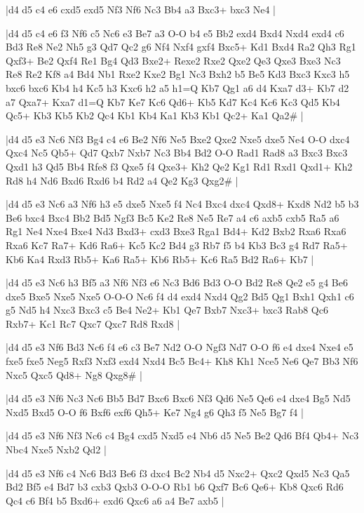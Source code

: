 \whitename{}
\blackname{}
\makegametitle
|d4 d5 c4 e6 cxd5 exd5 Nf3 Nf6 Nc3 Bb4 a3 Bxc3+ bxc3 Ne4  |

\whitename{}
\blackname{}
\makegametitle
|d4 d5 c4 e6 f3 Nf6 c5 Nc6 e3 Be7 a3 O-O b4 e5 Bb2 exd4 Bxd4 Nxd4 exd4 c6 Bd3 Re8 Ne2 Nh5 g3 Qd7 Qc2 g6 Nf4 Nxf4 gxf4 Bxc5+ Kd1 Bxd4 Ra2 Qh3 Rg1 Qxf3+ Be2 Qxf4 Re1 Bg4 Qd3 Bxe2+ Rexe2 Rxe2 Qxe2 Qe3 Qxe3 Bxe3 Nc3 Re8 Re2 Kf8 a4 Bd4 Nb1 Rxe2 Kxe2 Bg1 Nc3 Bxh2 b5 Be5 Kd3 Bxc3 Kxc3 h5 bxc6 bxc6 Kb4 h4 Kc5 h3 Kxc6 h2 a5 h1=Q Kb7 Qg1 a6 d4 Kxa7 d3+ Kb7 d2 a7 Qxa7+ Kxa7 d1=Q Kb7 Ke7 Kc6 Qd6+ Kb5 Kd7 Kc4 Kc6 Kc3 Qd5 Kb4 Qc5+ Kb3 Kb5 Kb2 Qc4 Kb1 Kb4 Ka1 Kb3 Kb1 Qc2+ Ka1 Qa2\#  |

\whitename{}
\blackname{}
\makegametitle
|d4 d5 e3 Nc6 Nf3 Bg4 c4 e6 Be2 Nf6 Ne5 Bxe2 Qxe2 Nxe5 dxe5 Ne4 O-O dxc4 Qxc4 Nc5 Qb5+ Qd7 Qxb7 Nxb7 Nc3 Bb4 Bd2 O-O Rad1 Rad8 a3 Bxc3 Bxc3 Qxd1 h3 Qd5 Bb4 Rfe8 f3 Qxe5 f4 Qxe3+ Kh2 Qe2 Kg1 Rd1 Rxd1 Qxd1+ Kh2 Rd8 h4 Nd6 Bxd6 Rxd6 b4 Rd2 a4 Qe2 Kg3 Qxg2\#  |

\whitename{}
\blackname{}
\makegametitle
|d4 d5 e3 Nc6 a3 Nf6 h3 e5 dxe5 Nxe5 f4 Nc4 Bxc4 dxc4 Qxd8+ Kxd8 Nd2 b5 b3 Be6 bxc4 Bxc4 Bb2 Bd5 Ngf3 Bc5 Ke2 Re8 Ne5 Re7 a4 c6 axb5 cxb5 Ra5 a6 Rg1 Ne4 Nxe4 Bxe4 Nd3 Bxd3+ cxd3 Bxe3 Rga1 Bd4+ Kd2 Bxb2 Rxa6 Rxa6 Rxa6 Kc7 Ra7+ Kd6 Ra6+ Kc5 Kc2 Bd4 g3 Rb7 f5 b4 Kb3 Bc3 g4 Rd7 Ra5+ Kb6 Ka4 Rxd3 Rb5+ Ka6 Ra5+ Kb6 Rb5+ Kc6 Ra5 Bd2 Ra6+ Kb7  |

\whitename{}
\blackname{}
\makegametitle
|d4 d5 e3 Nc6 h3 Bf5 a3 Nf6 Nf3 e6 Nc3 Bd6 Bd3 O-O Bd2 Re8 Qe2 e5 g4 Be6 dxe5 Bxe5 Nxe5 Nxe5 O-O-O Nc6 f4 d4 exd4 Nxd4 Qg2 Bd5 Qg1 Bxh1 Qxh1 c6 g5 Nd5 h4 Nxc3 Bxc3 c5 Be4 Ne2+ Kb1 Qe7 Bxb7 Nxc3+ bxc3 Rab8 Qc6 Rxb7+ Kc1 Rc7 Qxc7 Qxc7 Rd8 Rxd8  |

\whitename{}
\blackname{}
\makegametitle
|d4 d5 e3 Nf6 Bd3 Nc6 f4 e6 c3 Be7 Nd2 O-O Ngf3 Nd7 O-O f6 e4 dxe4 Nxe4 e5 fxe5 fxe5 Neg5 Rxf3 Nxf3 exd4 Nxd4 Bc5 Bc4+ Kh8 Kh1 Nce5 Ne6 Qe7 Bb3 Nf6 Nxc5 Qxc5 Qd8+ Ng8 Qxg8\#  |

\whitename{}
\blackname{}
\makegametitle
|d4 d5 e3 Nf6 Nc3 Nc6 Bb5 Bd7 Bxc6 Bxc6 Nf3 Qd6 Ne5 Qe6 e4 dxe4 Bg5 Nd5 Nxd5 Bxd5 O-O f6 Bxf6 exf6 Qh5+ Ke7 Ng4 g6 Qh3 f5 Ne5 Bg7 f4  |

\whitename{}
\blackname{}
\makegametitle
|d4 d5 e3 Nf6 Nf3 Nc6 c4 Bg4 cxd5 Nxd5 e4 Nb6 d5 Ne5 Be2 Qd6 Bf4 Qb4+ Nc3 Nbc4 Nxe5 Nxb2 Qd2  |

\whitename{}
\blackname{}
\makegametitle
|d4 d5 e3 Nf6 c4 Nc6 Bd3 Be6 f3 dxc4 Bc2 Nb4 d5 Nxc2+ Qxc2 Qxd5 Nc3 Qa5 Bd2 Bf5 e4 Bd7 b3 cxb3 Qxb3 O-O-O Rb1 b6 Qxf7 Bc6 Qe6+ Kb8 Qxc6 Rd6 Qc4 c6 Bf4 b5 Bxd6+ exd6 Qxc6 a6 a4 Be7 axb5  |

